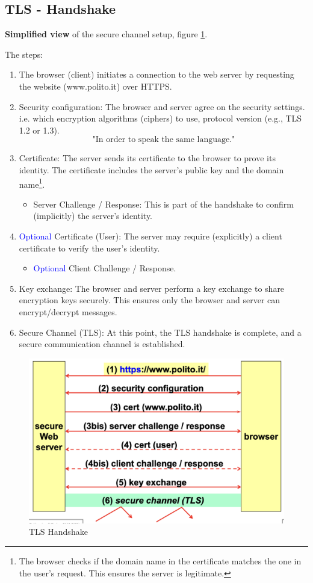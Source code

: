 \subsection{TLS - Handshake}
\begin{center}
    \textbf{Simplified view} of the secure channel setup, figure \ref{fig:tls_handshake}.
\end{center}
The steps:
\begin{enumerate}
    \item The browser (client) initiates a connection to the web server by requesting the website (www.polito.it) over HTTPS.
    \item Security configuration: The browser and server agree on the security settings. i.e. which encryption algorithms (ciphers) to use, protocol version (e.g., TLS 1.2 or 1.3).
    \[
        \text{"In order to speak the same language."}
    \]
    \item Certificate: The server sends its certificate to the browser to prove its identity. The certificate includes the server's public key and the domain name\footnote{The browser checks if the domain name in the certificate matches the one in the user’s request. This ensures the server is legitimate.}. 
    \begin{itemize}
        \item Server Challenge / Response: This is part of the handshake to confirm (implicitly) the server’s identity.
    \end{itemize} 
    \item  \textcolor{Blue}{Optional} Certificate (User): The server may require (explicitly) a client certificate to verify the user’s identity.
    \begin{itemize}
        \item \textcolor{Blue}{Optional} Client Challenge / Response.
    \end{itemize} 
    \item Key exchange: The browser and server perform a key exchange to share encryption keys securely. This ensures only the browser and server can encrypt/decrypt messages.
    \item Secure Channel (TLS): At this point, the TLS handshake is complete, and a secure communication channel is established.
\end{enumerate}

\begin{figure}[H]
    \centering
    \includegraphics[width=0.6\linewidth]{Images/Appsec/tls_handshake.png}
    \caption{TLS Handshake}
    \label{fig:tls_handshake}
\end{figure}

